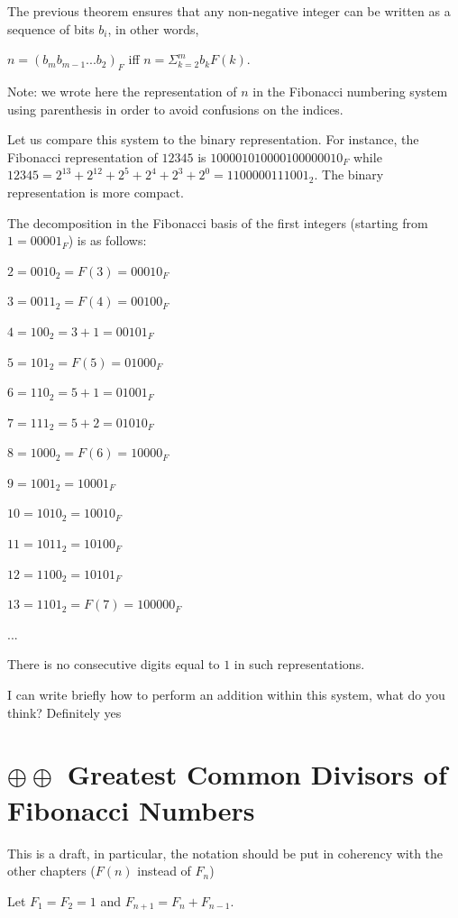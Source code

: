 The previous theorem ensures that any non-negative integer can be written
as a sequence of bits $b_i$, in other words,

$n = (b_mb_{m-1}...b_2)_F$ iff $n = \Sigma_{k=2}^m b_k F(k)$.

Note: we wrote here the representation of $n$ in the Fibonacci numbering system using parenthesis in order to avoid confusions 
on the indices.

Let us compare this system to the binary representation.
For instance, the Fibonacci representation of $12345$ is $100001010000100000010_F$
while  $12345 = 2^{13} + 2^{12} + 2^{5} + 2^{4} + 2^{3} + 2^{0} = 1100000111001_2$.
The binary representation is more compact. 
\bigskip

The decomposition in the Fibonacci basis of the first integers (starting from $1 = 00001_F$) is as follows:

 $2 = 0010_2 = F(3) = 00010_F$
 
 $3 = 0011_2 = F(4) = 00100_F$
  
 $4 = 100_2 = 3+1 = 00101_F$
 
 $5 = 101_2 = F(5) = 01000_F$
 
 $6 = 110_2 = 5+1 = 01001_F$
 
 $7 = 111_2 = 5+2 = 01010_F$
 
 $8 = 1000_2 = F(6) = 10000_F$
 
 $9 = 1001_2 = 10001_F$
 
 $10 = 1010_2 = 10010_F$
 
 $11 = 1011_2 = 10100_F$
 
 $12 = 1100_2 = 10101_F$
 
 $13 = 1101_2 = F(7) = 100000_F$
 
 ...
 
There is no consecutive digits equal to $1$ in such representations.
\medskip

{\Denis I can write briefly how to perform an addition within this system, what do you think?}
{\Arny Definitely yes}



\section{$\oplus \oplus$ Greatest Common Divisors of Fibonacci Numbers}
\label{Appendix:FiboGCD}

This is a draft, in particular, the notation should be put in coherency with the other chapters
($F(n)$ instead of $F_n$)
\bigskip

Let $F_1=F_2=1$ and $F_{n+1}=F_n+F_{n-1}$.
\medskip

